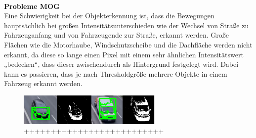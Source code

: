 \documentclass[conference]{IEEEtran}
\begin{document}
	\\
	\textbf{Probleme MOG}\\
	Eine Schwierigkeit bei der Objekterkennung ist, dass die Bewegungen hauptsächlich bei großen Intensitätsunterschieden wie der Wechsel von Straße zu Fahrzeuganfang und von Fahrzeugende zur Straße, erkannt werden. Große Flächen wie die Motorhaube, Windschutzscheibe und die Dachfläche werden nicht erkannt, da diese so lange einen Pixel mit einem sehr ähnlichen Intensitätswert „bedecken“, dass dieser zwischendurch als Hintergrund festgelegt wird. Dabei kann es passieren, dass je nach Thresholdgröße mehrere Objekte in einem Fahrzeug erkannt werden.
	\begin{figure}[!h]
		\begin{center}
			\includegraphics[width=7cm]{Media/MOGVergleich.png}
			\caption{++++++++++++++++++++++++++}
			\label{mogKonzept}
		\end{center}
	\end{figure}
	
	
\end{document}
